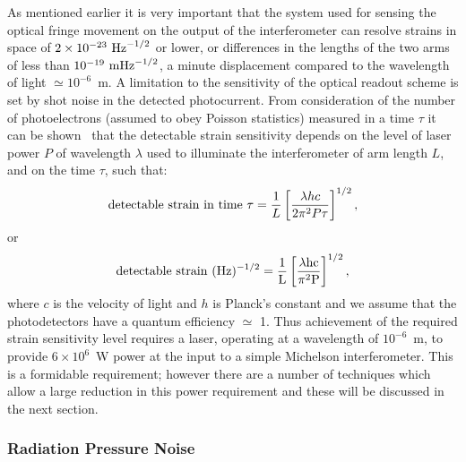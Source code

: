 \documentclass{article}
\begin{document}
As mentioned earlier it is very important that the system used for sensing the
optical fringe movement on the output of the interferometer can resolve strains
in space of $2 \times 10^{-23}~{\rm Hz}^{-1/2}$ or lower, or differences in the
lengths of the two arms of less than $10^{-19}~{\rm m}{\rm Hz}^{-1/2}$, a
minute displacement compared to the wavelength of light $\simeq 10^{-6}$~m. A
limitation to the sensitivity of the optical readout scheme is set by shot noise
in the detected photocurrent. From consideration of the number of photoelectrons
(assumed to obey Poisson statistics) measured in a time $\tau$ it can be
shown~\cite{HoughMG5} that the detectable strain sensitivity depends on the
level of laser power $P$ of wavelength $\lambda$ used to illuminate the
interferometer of arm length $L$, and on the time $\tau$, such that:
%
\begin{equation}
  {\rm detectable\ strain\ in\ time\ } \tau = \frac 1{L}\left[\frac{\lambda h
  c}{2 \pi^{2} P \tau}\right]^{1/2},
  \label{equation:shot1}
\end{equation}
%
or
%
\begin{equation}
  {\rm detectable\ strain\ }(\rm Hz)^{-1/2} = \frac
  1{L}\left[\frac{\lambda h c}{\pi^{2} P }\right]^{1/2},
  \label{equation:shot2}
\end{equation}
%
where $c$ is the velocity of light and $h$ is Planck's constant and we assume
that the photodetectors have a quantum efficiency $\simeq$ 1. Thus achievement
of the required strain sensitivity level requires a laser, operating at a
wavelength of $10^{-6}$~m, to provide $6 \times 10^{6}$~W power at the input to
a simple Michelson interferometer. This is a formidable requirement; however
there are a number of techniques which allow a large reduction in this power
requirement and these will be discussed in the next section.


\subsubsection{Radiation Pressure Noise}
\label{subsubsection:radiationnoise}
\end{document}
